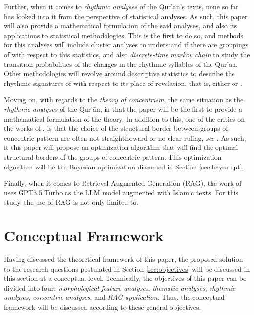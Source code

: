 Further, when it comes to \textit{rhythmic analyses} of the Qur'\=an's texts, none so far has looked into it from the perspective of statistical analyses. As such, this paper will also provide a mathematical formulation of the said analyses, and also its applications to statistical methodologies. This is the first to do so, and methods for this analyses will include cluster analyses to understand if there are groupings of   with respect to this statistics, and also \textit{discrete-time markov chain} to study the transition probabilities of the changes in the rhythmic syllables of the Qur'\=an.  Other methodologies will revolve around descriptive statistics to describe the rhythmic signatures of   with respect to its place of revelation, that is, either   or  .

Moving on, with regards to the \textit{theory of concentrism}, the same situation as the \textit{rhythmic analyses} of the Qur'\=an, in that the paper will be the first to provide a mathematical formulation of the theory. In addition to this, one of the critics on the works of , is that the choice of the structural border between groups of concentric pattern are often not straightforward or no clear ruling, \textit{see} . As such, it this paper will propose an optimization algorithm that will find the optimal structural borders of the groups of concentric pattern. This optimization algorithm will be the Bayesian optimization discussed in Section \ref{sec:bayes-opt}.

Finally, when it comes to Retrieval-Augmented Generation (RAG), the work of  uses GPT3.5 Turbo as the LLM model augmented with Islamic texts. For this study, the use of RAG is not only limited to.

\section{Conceptual Framework}
Having discussed the theoretical framework of this paper, the proposed solution to the research questions postulated in Section \ref{sec:objectives} will be discussed in this section at a conceptual level. Technically, the objectives of this paper can be divided into four: \textit{morphological feature analyses}, \textit{thematic analyses}, \textit{rhythmic analyses}, \textit{concentric analyses}, and \textit{RAG application}. Thus, the conceptual framework will be discussed according to these general objectives.
